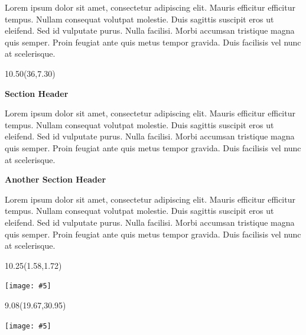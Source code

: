 \documentclass[final]{beamer}
\newcommand{\bodytext}[1]{
  \fontsize{30pt}{40pt}
  \selectfont
  \setlength{\parskip}{20pt}
  \raggedright
  #1%
}
\newcommand{\sectiontext}[1]{%
  {\centering\fontsize{40pt}{48pt}\selectfont\textbf{\textcolor{headercolor}{#1}}\par}%
  \vspace{20pt}%
}
\newcommand{\postertextbox}[5]{%
  \begin{textblock}{#3}(#1,#2)
    \begin{minipage}[t][#4in][t]{#3in}
      \begin{posterbox}[#4in]
        #5
      \end{posterbox}
    \end{minipage}
  \end{textblock}
}
\newcommand{\transparentimagebox}[6]{%
  \begin{textblock}{#3}(#1,#2)
    \begin{minipage}[t][#4in][t]{#3in}
      \centering
      \texttt{[image: \#5]}\par
      \vspace{0.2in}
      #6
    \end{minipage}
  \end{textblock}
}
\begin{document}
\begin{frame}[t]
{    \vspace{50pt}
  
  \bodytext{
    Lorem ipsum dolor sit amet, consectetur adipiscing elit. Mauris efficitur efficitur tempus. Nullam consequat volutpat molestie. Duis sagittis suscipit eros ut eleifend. Sed id vulputate purus. Nulla facilisi. Morbi accumsan tristique magna quis semper. Proin feugiat ante quis metus tempor gravida. Duis facilisis vel nunc at scelerisque. 
  }
}

\postertextbox{36}{7.30}{10.50}{27}{
  \sectiontext{Section Header}
  
  \bodytext{
    Lorem ipsum dolor sit amet, consectetur adipiscing elit. Mauris efficitur efficitur tempus. Nullam consequat volutpat molestie. Duis sagittis suscipit eros ut eleifend. Sed id vulputate purus. Nulla facilisi. Morbi accumsan tristique magna quis semper. Proin feugiat ante quis metus tempor gravida. Duis facilisis vel nunc at scelerisque. 
  }

  \vspace{50pt}
  \sectiontext{Another Section Header}

  \bodytext{
    Lorem ipsum dolor sit amet, consectetur adipiscing elit. Mauris efficitur efficitur tempus. Nullam consequat volutpat molestie. Duis sagittis suscipit eros ut eleifend. Sed id vulputate purus. Nulla facilisi. Morbi accumsan tristique magna quis semper. Proin feugiat ante quis metus tempor gravida. Duis facilisis vel nunc at scelerisque. 
  }
}

\transparentimagebox{1.58}{1.72}{10.25}{3.88}{images/FAU_CEECS_White.png}{}
\transparentimagebox{19.67}{30.95}{9.08}{3.44}{images/FAU_CEECS_Color.png}{}

\end{frame}
\end{document}

